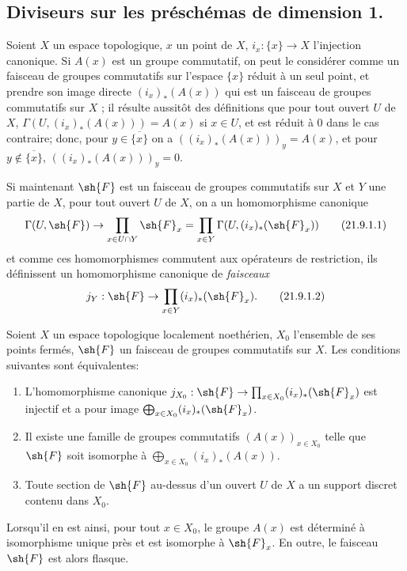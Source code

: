 \subsection{Diviseurs sur les préschémas de dimension 1.}
\label{IV.21.9}

\begin{env}[21.9.1]
\label{IV.21.9.1}
Soient $X$ un espace topologique, $x$ un point de $X$, $i_x:\{x\}\to X$ l'injection canonique.
Si $A(x)$ est un groupe commutatif, on peut le considérer comme un faisceau de groupes commutatifs sur l'espace $\{x\}$ réduit à un seul point, et prendre son image directe $(i_x)_*(A(x))$ qui est un faisceau de groupes commutatifs sur $X$ ;
il résulte aussitôt des définitions que pour tout ouvert $U$ de $X$, $\Gamma(U,(i_x)_*(A(x)))=A(x)$ si $x\in U$, et est réduit à $0$ dans le cas contraire;
donc, pour $y\in\overline{\{x\}}$ on a $((i_x)_*(A(x)))_y=A(x)$, et pour $y\notin\overline{\{x\}}$, $((i_x)_*(A(x)))_y=0$.

Si maintenant $\sh{F}$ est un faisceau de groupes commutatifs sur $X$ et $Y$ une partie de $X$, pour tout ouvert $U$ de $X$, on a un homomorphisme canonique
\[
\label{IV.21.9.1.1}
  \Gamma(U,\sh{F})\to\prod_{x\in U\cap Y}\sh{F}_x
  =\prod_{x\in Y}\Gamma(U,(i_x)_*(\sh{F}_x))
  \tag{21.9.1.1}
\]
et comme ces homomorphismes commutent aux opérateurs de restriction, ils définissent un homomorphisme canonique de \emph{faisceaux}
\[
\label{IV.21.9.1.2}
  j_Y:\sh{F}\to\prod_{x\in Y}(i_x)_*(\sh{F}_x).
  \tag{21.9.1.2}
\]
\end{env}

\begin{lemma}[21.9.2]
\label{IV.21.9.2}
Soient $X$ un espace topologique localement noethérien, $X_0$ l'ensemble de ses points fermés, $\sh{F}$ un faisceau de groupes commutatifs sur $X$.
Les conditions suivantes sont équivalentes:
\begin{enumerate}[label=\emph{\alph*)}]
  \item L'homomorphisme canonique $j_{X_0}:\sh{F}\to\prod_{x\in X_0}(i_x)_*(\sh{F}_x)$ est injectif et a pour image $\bigoplus_{x\in X_0}(i_x)_*(\sh{F}_x)$.
  \item[\rm a$'$)] Il existe une famille de groupes commutatifs $(A(x))_{x\in X_0}$ telle que $\sh{F}$ soit isomorphe à $\bigoplus_{x\in X_0}(i_x)_*(A(x))$.
  \item Toute section de $\sh{F}$ au-dessus d'un ouvert $U$ de $X$ a un support discret contenu dans $X_0$.
\end{enumerate}

Lorsqu'il en est ainsi, pour tout $x\in X_0$, le groupe $A(x)$ est déterminé à isomorphisme unique près et est isomorphe à $\sh{F}_x$.
En outre, le faisceau $\sh{F}$ est alors flasque.
\end{lemma}

